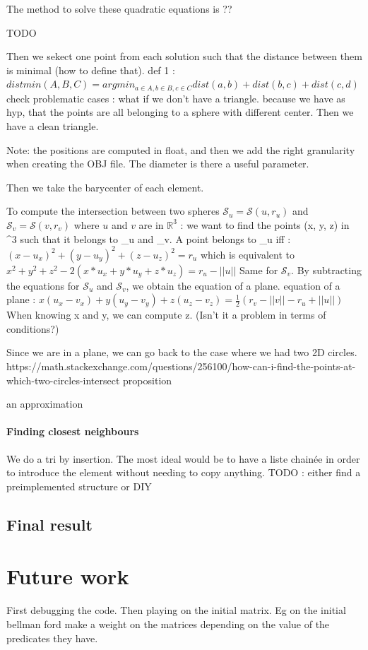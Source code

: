 \documentclass{article}
\begin{document}
The method to solve these quadratic equations is ?? 

TODO

Then we sekect one point from each solution such that the distance between them is minimal (how to define that). 
def 1 : $distmin(A, B, C) = argmin_{a \in A, b \in B, c \in C}  dist(a, b) + dist(b, c) + dist(c, d)$
check problematic cases : what if we don't have a triangle.
because we have as hyp, that the points are all belonging to a sphere with different center. Then we have a clean triangle. 


Note: the positions are computed in float, and then we add the right granularity when creating the OBJ file. The diameter is there a useful parameter. 

Then we take the barycenter of each element. 

To compute the intersection between two spheres $\mathcal{S}_{u} = \mathcal{S}(u, r_{u})$ and $\mathcal{S}_{v} = \mathcal{S}(v, r_{v})$ where $u$ and $v$ are in $\mathbb{R}^3$ :
we want to find the points (x, y, z) in ^{3} such that it belongs to _{u} and _{v}. 
A point belongs to _{u} iff : 
$ (x-u_{x})^2 + (y - u_{y})^2 + (z - u_{z})^2 = r_{u}$
which is equivalent to \\
$x^2+ y^2+z^2 - 2 (x * u_{x} + y * u_{y} + z * u_{z}) = r_{u} - ||u||$
Same for $\mathcal{S}_v$.  
By subtracting the equations for $\mathcal{S}_u$ and $\mathcal{S}_v$, we obtain the equation of a plane. 
equation of a plane : 
$x(u_{x} - v_{x}) + y (u_{y} - v_{y}) + z (u_{z} - v_{z}) = \frac{1}{2} (r_{v} - ||v|| - r_{u} + ||u||)$
When knowing x and y, we can compute z. (Isn't it a problem in terms of conditions?)

Since we are in a plane, we can go back to the case where we had two 2D circles.  
https://math.stackexchange.com/questions/256100/how-can-i-find-the-points-at-which-two-circles-intersect proposition

an approximation


\paragraph{Finding closest neighbours}
We do a tri by insertion. 
The most ideal would be to have a liste chainée in order to introduce the element without needing to copy anything. 
TODO : either find a preimplemented structure or DIY






\subsection{Final result}



\section{Future work}
First debugging the code.
Then playing on the initial matrix. Eg on the initial bellman ford make a weight on the matrices depending on the value of the predicates they have. 

\printbibliography[
heading=bibintoc,
title={Bibliography}
]
\end{document}

